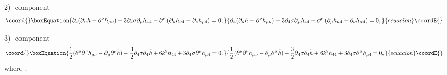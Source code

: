 \documentclass[a4paper,12pt]{article}
\begin{document}
 2) \coordHE{}-component
\begin{equation}\coord{}\boxEquation{\label{mu-4}
\partial_4 ( \partial_\mu \tilde h - \partial^\nu  h_{\mu\nu})-
3\partial_4 \sigma \partial_\mu h_{44} -
\partial^{\nu}\left(\partial_{\mu}h_{\nu 4}-\partial_{\nu}h_{\mu 4}\right)= 0,
}{\partial_4 ( \partial_\mu \tilde h - \partial^\nu  h_{\mu\nu})-
3\partial_4 \sigma \partial_\mu h_{44} -
\partial^{\nu}\left(\partial_{\mu}h_{\nu 4}-\partial_{\nu}h_{\mu 4}\right)= 0,
}{ecuacion}\coordE{}\end{equation}

 3) \coordHE{}-component
\begin{equation}\coord{}\boxEquation{\label{4-4}
\frac{1}{2}(\partial^\mu \partial^\nu  h_{\mu\nu} - \partial_\mu
\partial^\mu \tilde h ) - \frac{3}{2}\partial_4 \sigma \partial_4 \tilde h
+ 6 k^2 h_{44} +3\partial_4\sigma\partial^{\mu}h_{\mu 4}=0,
}{\frac{1}{2}(\partial^\mu \partial^\nu  h_{\mu\nu} - \partial_\mu
\partial^\mu \tilde h ) - \frac{3}{2}\partial_4 \sigma \partial_4 \tilde h
+ 6 k^2 h_{44} +3\partial_4\sigma\partial^{\mu}h_{\mu 4}=0,
}{ecuacion}\coordE{}\end{equation}
where \coordHE{}.
\end{document}
